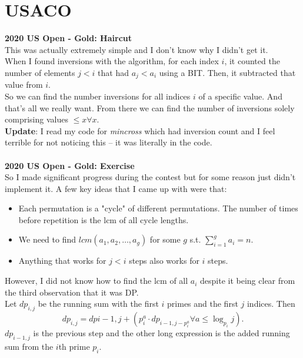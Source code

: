 \documentclass{article}
\begin{document}
\section{USACO}
\textbf{2020 US Open - Gold: Haircut}\\
This was actually extremely simple and I don't know why I didn't get it.\\
When I found inversions with the algorithm, for each index $i$, it counted the number of elements $j < i$ that had $a_j < a_i$ using a BIT. Then, it subtracted that value from $i$. \\
So we can find the number inversions for all indices $i$ of a specific value. And that's all we really want. From there we can find the number of inversions solely comprising values $\le x \forall x$. \\
\textbf{Update}: I read my code for \textit{mincross} which had inversion count and I feel terrible for not noticing this -- it was literally in the code. \\
\\
\textbf{2020 US Open - Gold: Exercise}\\
So I made significant progress during the contest but for some reason just didn't implement it. A few key ideas that I came up with were that:
\begin{itemize}
	\item Each permutation is a "cycle" of different permutations. The number of times before repetition is the lcm of all cycle lengths. \\
	\item We need to find $lcm(a_1, a_2, \dotsc, a_g)$ for some $g$ s.t. $\sum_{i=1}^g a_i = n$. \\
	\item Anything that works for $j < i$ steps also works for $i$ steps.
\end{itemize}
However, I did not know how to find the lcm of all $a_i$ despite it being clear from the third observation that it was DP. \\
Let $dp_{i, j}$ be the running sum with the first $i$ primes and the first $j$ indices. Then
$$dp_{i,j} = dp{i-1, j} + (p_i^a \cdot dp_{i-1, j-p_i^a} \forall a \le \log_{p_i}j).$$
$dp_{i-1, j}$ is the previous step and the other long expression is the added running sum from the $i$th prime $p_i$.
\end{document}
